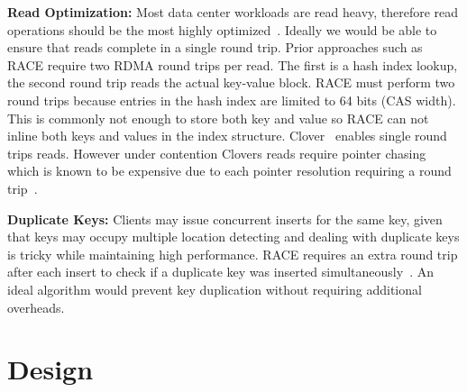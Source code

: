 \textbf{Read Optimization:} Most data center workloads are
read heavy, therefore read operations should be the most
highly optimized~\cite{datacenter-workloads,facebook-memcached}.
Ideally we would
be able to ensure that reads complete in a single round
trip.
Prior
approaches such as RACE require two RDMA round trips per
read. The first is a hash index lookup, the second round
trip reads the actual key-value block. RACE must perform two
round trips because entries in the hash index are limited to
64 bits (CAS width). This is commonly not enough to store
both key and value so RACE can not inline both keys and
values in the index structure. Clover~\cite{clover} enables
single round trips reads. However under contention Clovers
reads require pointer chasing which is known to be expensive
due to each pointer resolution requiring a round
trip~\cite{clio,clover,pointer-chaising}. 

\textbf{Duplicate Keys:} Clients may issue concurrent
inserts for the same key, given that keys may occupy
multiple location detecting and dealing with duplicate keys
is tricky while maintaining high performance. RACE requires
an extra round trip after each insert to check if a
duplicate key was inserted simultaneously~\cite{race}. An
ideal algorithm would prevent key duplication without
requiring additional overheads.


\section{Design}
\label{sec:design}

